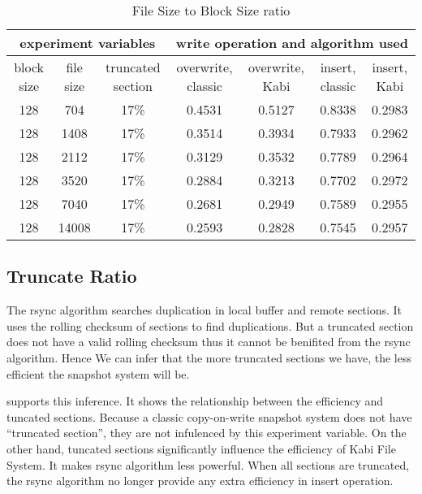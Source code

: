 \begin{lscape} 
\begin{table}
\caption{File Size to Block Size ratio}
\label{tab:fb_ratio}
\begin{center}
\begin{tabular}{|c|c|c|c|c|c|c|}
\hline
\multicolumn{3}{|c|}{experiment variables} & \multicolumn{4}{c|}{write operation and algorithm used} \\
\hline
block size & file size & truncated section & overwrite, classic & overwrite, Kabi & insert, classic & insert, Kabi\\
\hline
128 & 704 & 17\% & 0.4531 & 0.5127 & 0.8338 & 0.2983 \\
\hline
128 & 1408 & 17\% & 0.3514 & 0.3934 & 0.7933 & 0.2962 \\
\hline
128 & 2112 & 17\% & 0.3129 & 0.3532 & 0.7789 & 0.2964 \\
\hline
128 & 3520 & 17\% & 0.2884 & 0.3213 & 0.7702 & 0.2972 \\
\hline
128 & 7040 & 17\% & 0.2681 & 0.2949 & 0.7589 & 0.2955 \\
\hline
128 & 14008 & 17\% & 0.2593 & 0.2828 & 0.7545 & 0.2957 \\
\hline
\end{tabular}
\end{center}
\end{table}
\end{lscape}

\subsection{Truncate Ratio}

    The rsync algorithm searches duplication in local buffer and remote sections. It uses the rolling checksum of sections to find duplications. But a truncated section does not have a valid rolling checksum thus it cannot be benifited from the rsync algorithm. Hence We can infer that the more truncated sections we have, the less efficient the snapshot system will be.

     supports this inference. It shows the relationship between the efficiency and tuncated sections. Because a classic copy-on-write snapshot system does not have ``truncated section'', they are not infulenced by this experiment variable. On the other hand, tuncated sections significantly influence the efficiency of Kabi File System. It makes rsync algorithm less powerful. When all sections are truncated, the rsync algorithm no longer provide any extra efficiency in insert operation.

